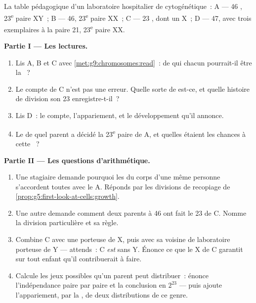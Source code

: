 \begin{problem}\label{pb:g9:chromosomes:1}
La table pédagogique d'un laboratoire hospitalier de
cytogénétique~:  A --- 46 , 23\textsuperscript{e}
paire XY~; B --- 46, 23\textsuperscript{e} paire XX~; C --- 23
, dont un X~; D --- 47, avec trois exemplaires
à la paire 21, 23\textsuperscript{e} paire XX.

\medskip\noindent\textbf{Partie I --- Les lectures.}
\begin{enumerate}
  \item Lis A, B et C avec
        \cref{met:g9:chromosomes:read}~: de qui chacun
        pourrait-il être la ~?
  \item Le compte de C n'est pas une erreur. Quelle sorte
        de  est-ce, et quelle histoire de division
        son 23 enregistre-t-il~?
  \item Lis D~: le compte, l'appariement, et le
        développement qu'il annonce.
  \item Le  de quel parent a décidé la 23\textsuperscript{e}
        paire de A, et quelles étaient les chances à cette
        ~?
\end{enumerate}

\medskip\noindent\textbf{Partie II --- Les questions
d'arithmétique.}
\begin{enumerate}[resume]
  \item Une stagiaire demande pourquoi les  du
        corps d'une même personne s'accordent toutes avec
        le  A. Réponds par les divisions de
        recopiage de
        \cref{prop:g5:first-look-at-cells:growth}.
  \item Une autre demande comment deux parents à 46 ont
        fait le 23 de C. Nomme la division particulière et
        sa règle.
  \item Combine C avec une  porteuse de X, puis
        avec sa voisine de laboratoire porteuse de Y ---
        attends~: C \emph{est} sans Y. Énonce ce que le X
        de C garantit sur tout enfant qu'il contribuerait à
        faire.
  \item Calcule les jeux possibles qu'un parent peut
        distribuer~: énonce l'indépendance paire par paire
        et la conclusion en $2^{23}$ --- puis ajoute
        l'appariement, par la , de deux
        distributions de ce genre.
\end{enumerate}


\end{problem}
